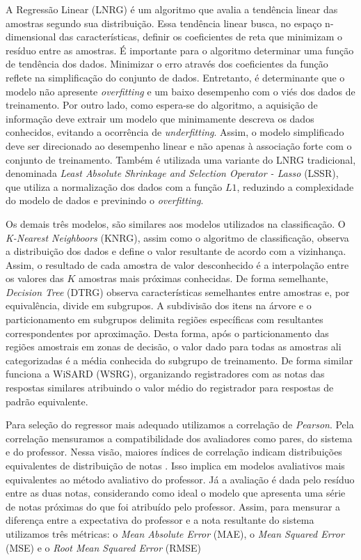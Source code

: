 A Regressão Linear (LNRG) é um algoritmo que avalia a tendência linear das amostras segundo sua distribuição. Essa tendência linear busca, no espaço n-dimensional das características, definir os coeficientes de reta que minimizam o resíduo entre as amostras. É importante para o algoritmo determinar uma função de tendência dos dados. Minimizar o erro através dos coeficientes da função reflete na simplificação do conjunto de dados. Entretanto, é determinante que o modelo não apresente \textit{overfitting} e um baixo desempenho com o viés dos dados de treinamento. Por outro lado, como espera-se do algoritmo, a aquisição de informação deve extrair um modelo que minimamente descreva os dados conhecidos, evitando a ocorrência de \textit{underfitting}. Assim, o modelo simplificado deve ser direcionado ao desempenho linear e não apenas à associação forte com o conjunto de treinamento. Também é utilizada uma variante do LNRG tradicional, denominada \textit{Least Absolute Shrinkage and Selection Operator - Lasso} (LSSR), que utiliza a normalização dos dados com a função $ L1 $, reduzindo a complexidade do modelo de dados e previnindo o \textit{overfitting}.

Os demais três modelos, são similares aos modelos utilizados na classificação. O \textit{K-Nearest Neighboors} (KNRG), assim como o algoritmo de classificação, observa a distribuição dos dados e define o valor resultante de acordo com a vizinhança. Assim, o resultado de cada amostra de valor desconhecido é a interpolação entre os valores das $ K $ amostras mais próximas conhecidas. De forma semelhante, \textit{Decision Tree} (DTRG) observa características semelhantes entre amostras e, por equivalência, divide em subgrupos. A subdivisão dos itens na árvore e o particionamento em subgrupos delimita regiões específicas com resultantes correspondentes por aproximação. Desta forma, após o particionamento das regiões amostrais em zonas de decisão, o valor dado para todas as amostras ali categorizadas é a média conhecida do subgrupo de treinamento. De forma similar funciona a WiSARD (WSRG), organizando registradores com as notas das respostas similares atribuindo o valor médio do registrador para respostas de padrão equivalente.

Para seleção do regressor mais adequado utilizamos a correlação de \textit{Pearson}. Pela correlação mensuramos a compatibilidade dos avaliadores como pares, do sistema e do professor. Nessa visão, maiores índices de correlação indicam distribuições equivalentes de distribuição de notas \cite{morettin2010}. Isso implica em modelos avaliativos mais equivalentes ao método avaliativo do professor. Já a avaliação é dada pelo resíduo entre as duas notas, considerando como ideal o modelo que apresenta uma série de notas próximas do que foi atribuído pelo professor. Assim, para mensurar a diferença entre a expectativa do professor e a nota resultante do sistema utilizamos três métricas: o \textit{Mean Absolute Error} (MAE), o \textit{Mean Squared Error} (MSE) e o \textit{Root Mean Squared Error} (RMSE)

